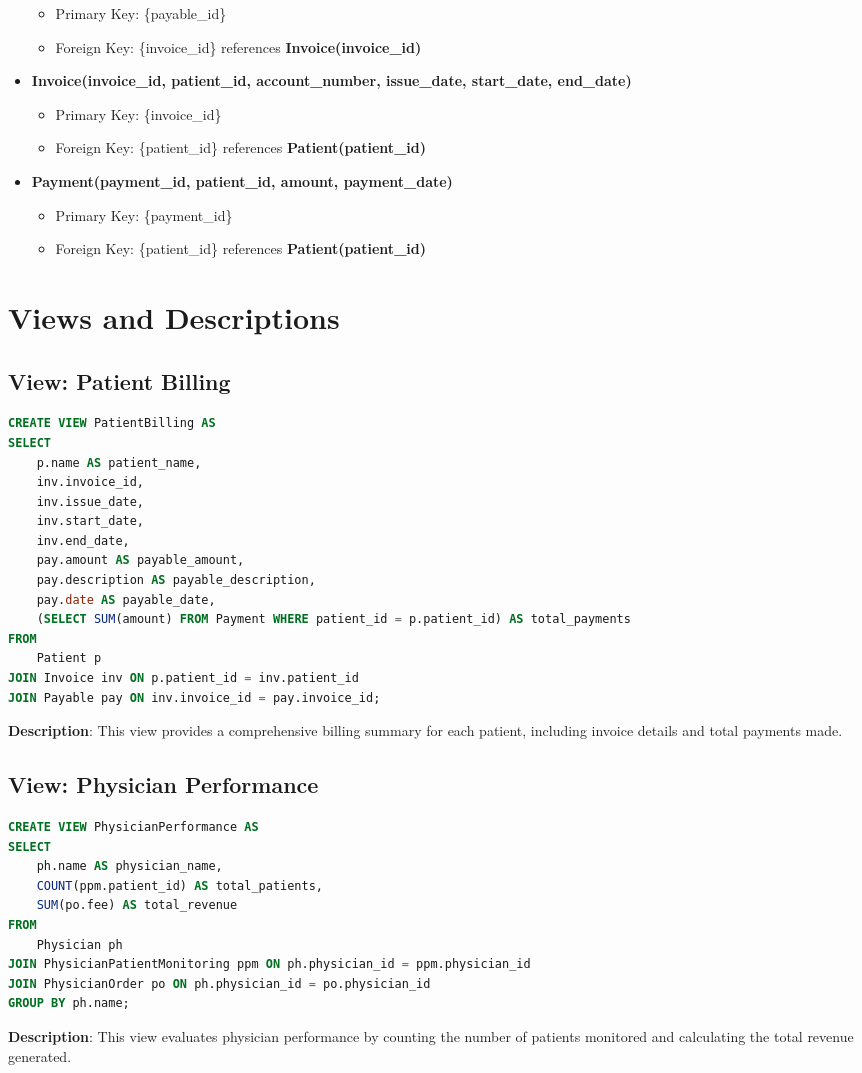 \documentclass{article}
\begin{document}
\begin{itemize}
\begin{itemize}
            \item Primary Key: \{payable\_id\}
            \item Foreign Key: \{invoice\_id\} references \textbf{Invoice(invoice\_id)}
        \end{itemize}
    \item \textbf{Invoice(invoice\_id, patient\_id, account\_number, issue\_date, start\_date, end\_date)}
        \begin{itemize}
            \item Primary Key: \{invoice\_id\}
            \item Foreign Key: \{patient\_id\} references \textbf{Patient(patient\_id)}
        \end{itemize}
    \item \textbf{Payment(payment\_id, patient\_id, amount, payment\_date)}
        \begin{itemize}
            \item Primary Key: \{payment\_id\}
            \item Foreign Key: \{patient\_id\} references \textbf{Patient(patient\_id)}
        \end{itemize}
\end{itemize}

\section{Views and Descriptions}
\subsection{View: Patient Billing}
\begin{lstlisting}[language=SQL]
CREATE VIEW PatientBilling AS
SELECT 
    p.name AS patient_name,
    inv.invoice_id,
    inv.issue_date,
    inv.start_date,
    inv.end_date,
    pay.amount AS payable_amount,
    pay.description AS payable_description,
    pay.date AS payable_date,
    (SELECT SUM(amount) FROM Payment WHERE patient_id = p.patient_id) AS total_payments
FROM 
    Patient p
JOIN Invoice inv ON p.patient_id = inv.patient_id
JOIN Payable pay ON inv.invoice_id = pay.invoice_id;
\end{lstlisting}
\textbf{Description}: This view provides a comprehensive billing summary for each patient, including invoice details and total payments made.

\subsection{View: Physician Performance}
\begin{lstlisting}[language=SQL]
CREATE VIEW PhysicianPerformance AS
SELECT 
    ph.name AS physician_name,
    COUNT(ppm.patient_id) AS total_patients,
    SUM(po.fee) AS total_revenue
FROM 
    Physician ph
JOIN PhysicianPatientMonitoring ppm ON ph.physician_id = ppm.physician_id
JOIN PhysicianOrder po ON ph.physician_id = po.physician_id
GROUP BY ph.name;
\end{lstlisting}
\textbf{Description}: This view evaluates physician performance by counting the number of patients monitored and calculating the total revenue generated.
\end{document}
